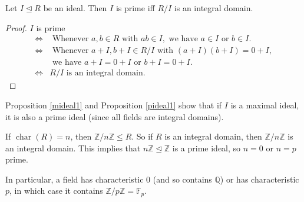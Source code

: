 \documentclass[egregdoesnotlikesansseriftitles,a4paper]{scrartcl}
\begin{document}
\begin{proposition}\label{pideal1}
       Let $I \unlhd R$ be an ideal. Then $I$ is prime iff $R/I$ is an integral domain.
       \begin{proof}
            $I$ is prime
            \begin{align*}
                 \iff & \text{ Whenever } a,b \in R \text{ with } ab \in I, \text{ we have } a \in I \text{ or } b \in I. \\
                 \iff & \text{ Whenever } a+I,b+I \in R/I \text{ with } (a+I)(b+I)=0+I,\\& \text{ we have } a+I=0+I \text{ or } b+I=0+I.\\
                 \iff & R/I \text{ is an integral domain.} 
            \end{align*}
     \end{proof}
\end{proposition}
\begin{remark}
       Proposition \ref{mideal1} and Proposition \ref{pideal1} show that if $I$ is a maximal ideal, it is also a prime ideal (since all fields are integral domains).
\end{remark}
\begin{remark}
       If $\operatorname{char}(R)=n$, then $\mathbb{Z}/n\mathbb{Z} \leq R$. So if $R$ is an integral domain, then $\mathbb{Z}/n\mathbb{Z}$ is an integral domain. This implies that $n\mathbb{Z} \unlhd \mathbb{Z}$ is a prime ideal, so $n=0$ or $n=p$ prime.

       In particular, a field has characteristic 0 (and so contains $\mathbb{Q}$) or has characteristic $p$, in which case it contains $\mathbb{Z}/p\mathbb{Z}=\mathbb{F}_{p}$.
\end{remark}
\newpage
\end{document}
